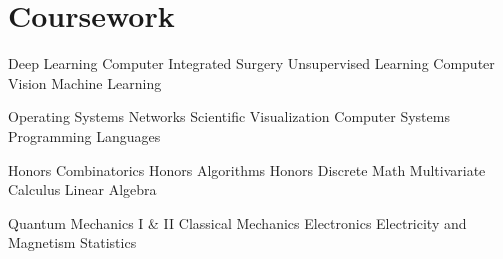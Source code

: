 \documentclass[letterpaper,11pt]{article}
\newcommand{\delim}{\hspace{.1em}\textbullet\hspace{.25em}}
\newcommand{\resumeItem}[2]{
  \item\small{
    \textbf{#1}{: #2 \vspace{-2pt}}
  }
}
\newcommand{\resumeSubItem}[2]{\resumeItem{#1}{#2}\vspace{-4pt}}
\begin{document}
\section{Coursework}

Deep Learning \delim Computer Integrated Surgery \delim
Unsupervised Learning \delim Computer Vision \delim
Machine Learning

Operating Systems \delim Networks \delim Scientific Visualization
\delim Computer Systems \delim Programming Languages

Honors Combinatorics \delim Honors Algorithms \delim Honors Discrete Math
\delim Multivariate Calculus \delim Linear Algebra

Quantum Mechanics I \& II \delim Classical Mechanics \delim Electronics
\delim Electricity and Magnetism \delim Statistics



  
\end{document}
